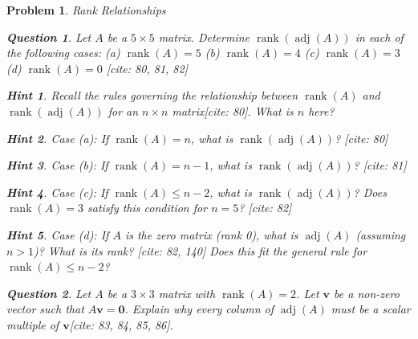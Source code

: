 \documentclass[12pt]{article}
\newtheorem{problem}{Problem}[section]
\newtheorem{question}{Question}[problem]
\theoremstyle{definition}
\newtheorem{hint}{Hint}[question]
\newcommand{\adj}{\operatorname{adj}}
\newcommand{\rank}{\operatorname{rank}}
\begin{document}
\begin{problem}{Rank Relationships}
    \begin{question}
        Let $A$ be a $5 \times 5$ matrix. Determine $\rank(\adj(A))$ in each of the following cases:
        (a) $\rank(A) = 5$
        (b) $\rank(A) = 4$
        (c) $\rank(A) = 3$
        (d) $\rank(A) = 0$ [cite: 80, 81, 82]
    \end{question}
    
        \begin{hint}
            Recall the rules governing the relationship between $\rank(A)$ and $\rank(\adj(A))$ for an $n \times n$ matrix[cite: 80]. What is $n$ here?
        \end{hint}
        \begin{hint}
            Case (a): If $\rank(A) = n$, what is $\rank(\adj(A))$? [cite: 80]
        \end{hint}
        \begin{hint}
            Case (b): If $\rank(A) = n-1$, what is $\rank(\adj(A))$? [cite: 81]
        \end{hint}
        \begin{hint}
            Case (c): If $\rank(A) \le n-2$, what is $\rank(\adj(A))$? Does $\rank(A)=3$ satisfy this condition for $n=5$? [cite: 82]
        \end{hint}
        \begin{hint}
            Case (d): If $A$ is the zero matrix (rank 0), what is $\adj(A)$ (assuming $n>1$)? What is its rank? [cite: 82, 140] Does this fit the general rule for $\rank(A) \le n-2$?
        \end{hint}
    

    \begin{question}
        Let $A$ be a $3 \times 3$ matrix with $\rank(A)=2$. Let $\mathbf{v}$ be a non-zero vector such that $A\mathbf{v} = \mathbf{0}$. Explain why every column of $\adj(A)$ must be a scalar multiple of $\mathbf{v}$[cite: 83, 84, 85, 86].
    \end{question}
    

\end{problem}
\end{document}
